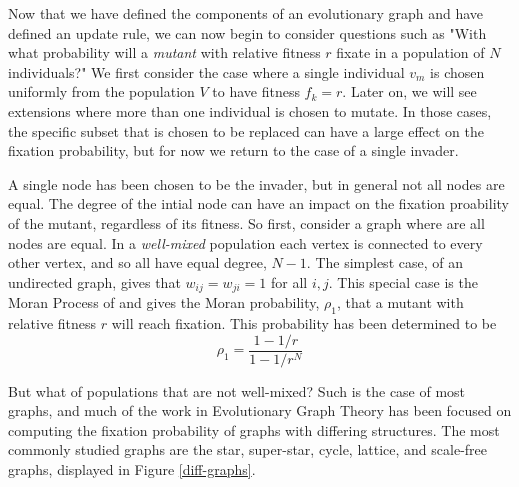 \documentclass[12pt, AofM.tex]{subfiles}
\begin{document}
Now that we have defined the components of an evolutionary graph and have defined an update rule, we can now begin to consider questions such as "With what probability will a \emph{mutant} with relative fitness $r$ fixate in a population of $N$ individuals?" We first consider the case where a single individual $v_m$ is chosen uniformly from the population $V$ to have fitness $f_k = r$. Later on, we will see extensions where more than one individual is chosen to mutate. In those cases, the specific subset that is chosen to be replaced can have a large effect on the fixation probability, but for now we return to the case of a single invader. 

A single node has been chosen to be the invader, but in general not all nodes are equal. The degree of the intial node can have an impact on the fixation proability of the mutant, regardless of its fitness. So first, consider a graph where are all nodes are equal. In a \emph{well-mixed} population each vertex is connected to every other vertex, and so all have equal degree, $N-1$. The simplest case, of an undirected graph, gives that $w_{ij} = w_{ji} =  1$ for all $i,j$. This special case is the Moran Process of \cite{moranRandomProcessesGenetics1958} and gives the Moran probability, $\rho_1$, that a mutant with relative fitness $r$ will reach fixation. This probability has been determined to be 
\begin{equation}
\rho_1 = \frac{1-1/r}{1-1/r^N}
\end{equation}  

But what of populations that are not well-mixed? Such is the case of most graphs, and much of the work in Evolutionary Graph Theory has been focused on computing the fixation probability of graphs with differing structures. The most commonly studied graphs are the star, super-star, cycle, lattice, and scale-free graphs, displayed in Figure \ref{diff-graphs}.
\end{document}
